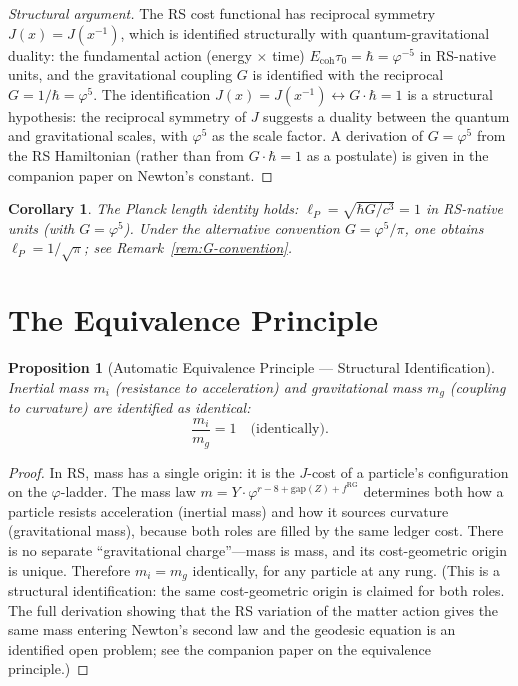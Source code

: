 \documentclass[12pt,a4paper]{article}
\newtheorem{corollary}[theorem]{Corollary}
\newtheorem{proposition}[theorem]{Proposition}
\theoremstyle{definition}
\theoremstyle{remark}
\begin{document}
\begin{proof}[Structural argument]
The RS cost functional has reciprocal symmetry $J(x) = J(x^{-1})$,
which is identified structurally with quantum-gravitational duality:
the fundamental action (energy $\times$ time) $E_\mathrm{coh}\tau_0 = \hbar
= \varphi^{-5}$ in RS-native units, and the gravitational coupling
$G$ is identified with the reciprocal $G = 1/\hbar = \varphi^5$.
The identification $J(x) = J(x^{-1}) \leftrightarrow G \cdot \hbar = 1$
is a structural hypothesis: the reciprocal symmetry of $J$ suggests a
duality between the quantum and gravitational scales, with $\varphi^5$
as the scale factor.  A derivation of $G = \varphi^5$ from the RS Hamiltonian
(rather than from $G\cdot\hbar = 1$ as a postulate) is given in the
companion paper on Newton's constant.
\end{proof}

\begin{corollary}
The Planck length identity holds:
$\ell_P = \sqrt{\hbar G/c^3} = 1$ in RS-native units
(with $G = \varphi^5$).  Under the alternative convention
$G = \varphi^5/\pi$, one obtains $\ell_P = 1/\sqrt{\pi}$;
see Remark~\ref{rem:G-convention}.
\end{corollary}

\section{The Equivalence Principle}
\label{sec:equivalence}

\begin{proposition}[Automatic Equivalence Principle --- Structural Identification]
\label{thm:equivalence}
Inertial mass $m_i$ (resistance to acceleration) and
gravitational mass $m_g$ (coupling to curvature) are
identified as identical:
\begin{equation}
  \boxed{\frac{m_i}{m_g} = 1 \quad
  \text{(identically).}}
\end{equation}
\end{proposition}

\begin{proof}
In RS, mass has a single origin: it is the $J$-cost of a
particle's configuration on the $\varphi$-ladder.  The
mass law
$m = Y \cdot \varphi^{r - 8 + \mathrm{gap}(Z) + f^{\mathrm{RG}}}$
determines both how a particle resists acceleration
(inertial mass) and how it sources curvature (gravitational
mass), because both roles are filled by the same ledger
cost.  There is no separate ``gravitational charge''---mass
is mass, and its cost-geometric origin is unique.
Therefore $m_i = m_g$ identically, for any particle at any
rung.  (This is a structural identification: the same cost-geometric
origin is claimed for both roles.  The full derivation showing that
the RS variation of the matter action gives the same mass entering
Newton's second law and the geodesic equation is an identified
open problem; see the companion paper on the equivalence principle.)
\end{proof}
\end{document}
